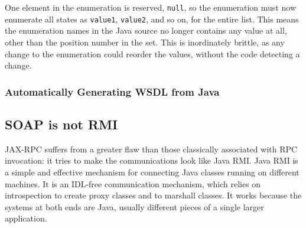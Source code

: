 One element in the enumeration is reserved, \verb|null|, so the
enumeration must now enumerate all states as \verb|value1|,
\verb|value2|, and so on, for the entire list. This means the
enumeration names in the Java source no longer contains any value at
all, other than the position number in the set. This is inordinately
brittle, as any change to the enumeration could reorder the values,
without the code detecting a change.

% 
% 
% 
% 


\subsubsection{Automatically Generating WSDL from Java}
\label{objections:o-x:wsdl-gen}


\subsection{SOAP is not RMI}
\label{soap-not-rmi}

JAX-RPC suffers from a greater flaw than those classically associated
with RPC invocation: it tries to make the communications look like
Java RMI. Java RMI is a simple and effective mechanism for connecting
Java classes running on different machines. It is an IDL-free
communication mechanism, which relies on introspection to create proxy
classes and to marshall classes. It works because the systems at both
ends are Java, usually different pieces of a single larger
application.

